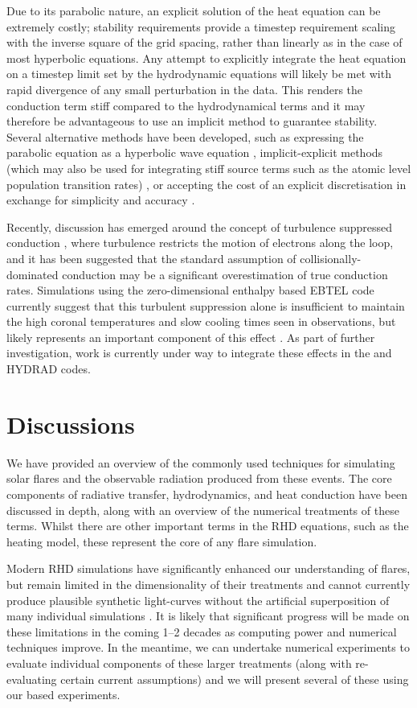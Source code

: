 Due to its parabolic nature, an explicit solution of the heat equation can be extremely costly; stability requirements provide a timestep requirement scaling with the inverse square of the grid spacing, rather than linearly as in the case of most hyperbolic equations.
Any attempt to explicitly integrate the heat equation on a timestep limit set by the hydrodynamic equations will likely be met with rapid divergence of any small perturbation in the data.
This renders the conduction term stiff compared to the hydrodynamical terms and it may therefore be advantageous to use an implicit method  to guarantee stability.
Several alternative methods have been developed, such as expressing the parabolic equation as a hyperbolic wave equation \citep{Rempel2016}, implicit-explicit methods (which may also be used for integrating stiff source terms such as the atomic level population transition rates) \citep[e.g.][]{Ascher1995}, or accepting the cost of an explicit discretisation in exchange for simplicity and accuracy \citep{Bradshaw2003, Bradshaw2013}.

Recently, discussion has emerged around the concept of turbulence suppressed conduction \citep{Bian2016}, where turbulence restricts the motion of electrons along the loop, and it has been suggested that the standard assumption of collisionally-dominated conduction may be a significant overestimation of true conduction rates.
Simulations using the zero-dimensional enthalpy based EBTEL code \citep{Klimchuk2008} currently suggest that this turbulent suppression alone is insufficient to maintain the high coronal temperatures and slow cooling times seen in observations, but likely represents an important component of this effect \citep{Bian2018}.
As part of further investigation, work is currently under way to integrate these effects in the \Radyn{} and HYDRAD codes.

\section{Discussions}

We have provided an overview of the commonly used techniques for simulating solar flares and the observable radiation produced from these events.
The core components of radiative transfer, hydrodynamics, and heat conduction have been discussed in depth, along with an overview of the numerical treatments of these terms.
Whilst there are other important terms in the RHD equations, such as the heating model, these represent the core of any flare simulation.

Modern RHD simulations have significantly enhanced our understanding of flares, but remain limited in the dimensionality of their treatments and cannot currently produce plausible synthetic light-curves without the artificial superposition of many individual simulations \citep[e.g.][]{Kerr2020}.
It is likely that significant progress will be made on these limitations in the coming 1--2 decades as computing power and numerical techniques improve.
In the meantime, we can undertake numerical experiments to evaluate individual components of these larger treatments (along with re-evaluating certain current assumptions) and we will present several of these using our \Lw{} based experiments.